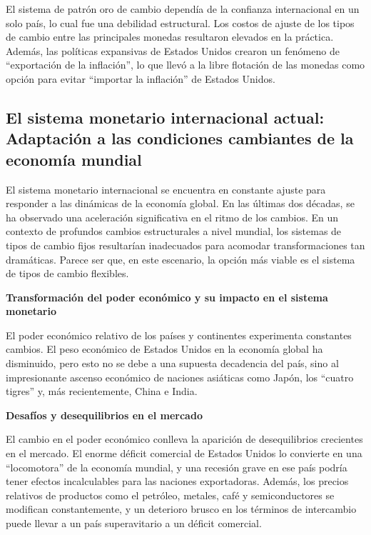 \documentclass[
  a4paper,
]{article}
\begin{document}
El sistema de patrón oro de cambio dependía de la confianza
internacional en un solo país, lo cual fue una debilidad estructural.
Los costos de ajuste de los tipos de cambio entre las principales
monedas resultaron elevados en la práctica. Además, las políticas
expansivas de Estados Unidos crearon un fenómeno de ``exportación de la
inflación'', lo que llevó a la libre flotación de las monedas como
opción para evitar ``importar la inflación'' de Estados Unidos.

\hypertarget{el-sistema-monetario-internacional-actual-adaptaciuxf3n-a-las-condiciones-cambiantes-de-la-economuxeda-mundial}{%
\subsection{El sistema monetario internacional actual: Adaptación a las
condiciones cambiantes de la economía
mundial}\label{el-sistema-monetario-internacional-actual-adaptaciuxf3n-a-las-condiciones-cambiantes-de-la-economuxeda-mundial}}

El sistema monetario internacional se encuentra en constante ajuste para
responder a las dinámicas de la economía global. En las últimas dos
décadas, se ha observado una aceleración significativa en el ritmo de
los cambios. En un contexto de profundos cambios estructurales a nivel
mundial, los sistemas de tipos de cambio fijos resultarían inadecuados
para acomodar transformaciones tan dramáticas. Parece ser que, en este
escenario, la opción más viable es el sistema de tipos de cambio
flexibles.

\textbf{Transformación del poder económico y su impacto en el sistema
monetario}

El poder económico relativo de los países y continentes experimenta
constantes cambios. El peso económico de Estados Unidos en la economía
global ha disminuido, pero esto no se debe a una supuesta decadencia del
país, sino al impresionante ascenso económico de naciones asiáticas como
Japón, los ``cuatro tigres'' y, más recientemente, China e India.

\textbf{Desafíos y desequilibrios en el mercado}

El cambio en el poder económico conlleva la aparición de desequilibrios
crecientes en el mercado. El enorme déficit comercial de Estados Unidos
lo convierte en una ``locomotora'' de la economía mundial, y una
recesión grave en ese país podría tener efectos incalculables para las
naciones exportadoras. Además, los precios relativos de productos como
el petróleo, metales, café y semiconductores se modifican
constantemente, y un deterioro brusco en los términos de intercambio
puede llevar a un país superavitario a un déficit comercial.
\end{document}
